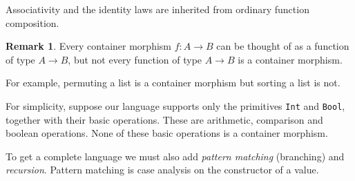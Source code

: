\documentclass[11pt, a4paper]{article}
\theoremstyle{definition}
\newtheorem{remark}[definition]{Remark}
\theoremstyle{plain}
\begin{document}
\medskip

\noindent
Associativity and the identity laws are inherited from ordinary
function composition.

\noindent\colorbox{blue!10}{\parbox{\dimexpr\linewidth-2\fboxsep}{%
\begin{remark}\label{rem:functions-as-morphisms}
Every container morphism $f : A \to B$ can be thought of as a
function of type $A \to B$, but not every function of type
$A \to B$ is a container morphism.

For example, permuting a list is a container morphism but sorting
a list is not.

For simplicity, suppose our language supports only the primitives
\texttt{Int} and \texttt{Bool}, together with their basic
operations.  These are arithmetic, comparison and boolean operations.  None
of these basic operations is a container morphism.

To get a complete language we must also add
\emph{pattern matching} (branching) and \emph{recursion}.  Pattern matching is
case analysis on the constructor of a value.
\end{remark}%
}}
\end{document}
